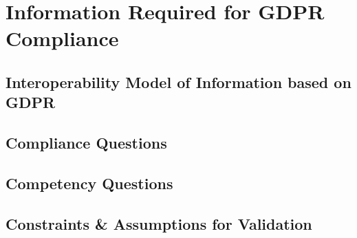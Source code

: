 \chapter{Information Required for GDPR Compliance}
\label{chapter:information}

\section{Interoperability Model of Information based on GDPR}\label{sec:info:model}

\section{Compliance Questions}\label{sec:info:compliance-questions}

\section{Competency Questions}\label{sec:info:competency-questions}

\section{Constraints \& Assumptions for Validation}\label{sec:info:constraints}
